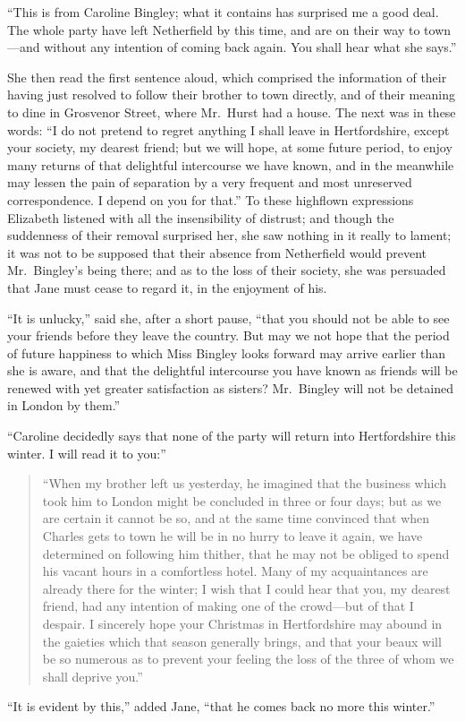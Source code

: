 \documentclass[12pt,english]{book}
\begin{document}
{}``This is from Caroline Bingley; what it contains has surprised
me a good deal. The whole party have left Netherfield by this time,
and are on their way to town\mbox{---}and without any intention of
coming back again. You shall hear what she says.''

She then read the first sentence aloud, which comprised the information
of their having just resolved to follow their brother to town directly,
and of their meaning to dine in Grosvenor Street, where Mr.\ Hurst
had a house. The next was in these words: {}``I do not pretend to
regret anything I shall leave in Hertfordshire, except your society,
my dearest friend; but we will hope, at some future period, to enjoy
many returns of that delightful intercourse we have known, and in
the meanwhile may lessen the pain of separation by a very frequent
and most unreserved correspondence. I depend on you for that.'' To
these highflown expressions Elizabeth listened with all the insensibility
of distrust; and though the suddenness of their removal surprised
her, she saw nothing in it really to lament; it was not to be supposed
that their absence from Netherfield would prevent Mr.\ Bingley's
being there; and as to the loss of their society, she was persuaded
that Jane must cease to regard it, in the enjoyment of his.

{}``It is unlucky,'' said she, after a short pause, {}``that you
should not be able to see your friends before they leave the country.
But may we not hope that the period of future happiness to which Miss
Bingley looks forward may arrive earlier than she is aware, and that
the delightful intercourse you have known as friends will be renewed
with yet greater satisfaction as sisters? Mr.\ Bingley will not be
detained in London by them.''

{}``Caroline decidedly says that none of the party will return into
Hertfordshire this winter. I will read it to you:''

\begin{quotation}
{}``When my brother left us yesterday, he imagined that the business
which took him to London might be concluded in three or four days;
but as we are certain it cannot be so, and at the same time convinced
that when Charles gets to town he will be in no hurry to leave it
again, we have determined on following him thither, that he may not
be obliged to spend his vacant hours in a comfortless hotel. Many
of my acquaintances are already there for the winter; I wish that
I could hear that you, my dearest friend, had any intention of making
one of the crowd\mbox{---}but of that I despair. I sincerely hope
your Christmas in Hertfordshire may abound in the gaieties which that
season generally brings, and that your beaux will be so numerous as
to prevent your feeling the loss of the three of whom we shall deprive
you.''
\end{quotation}
{}``It is evident by this,'' added Jane, {}``that he comes back
no more this winter.''
\end{document}
